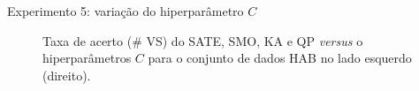 \documentclass{beamer}
\begin{document}
\begin{frame}{Experimento 5: variação do hiperparâmetro $C$}
\begin{figure}[!htbp]
    \centering
   
  \begin{subfigure}[b]{0.48\textwidth}
        \caption{}
    \end{subfigure}
    \begin{subfigure}[b]{0.48\textwidth}
        \caption{}
    \end{subfigure}
  
   
   
    
    \caption{
    Taxa de acerto (\# VS) do SATE, SMO, KA e QP \textit{versus} o hiperparâmetros $C$ para o conjunto de dados HAB no lado esquerdo (direito).}\label{fig:accuracy_C1} 
\end{figure}
\end{frame}
\end{document}
